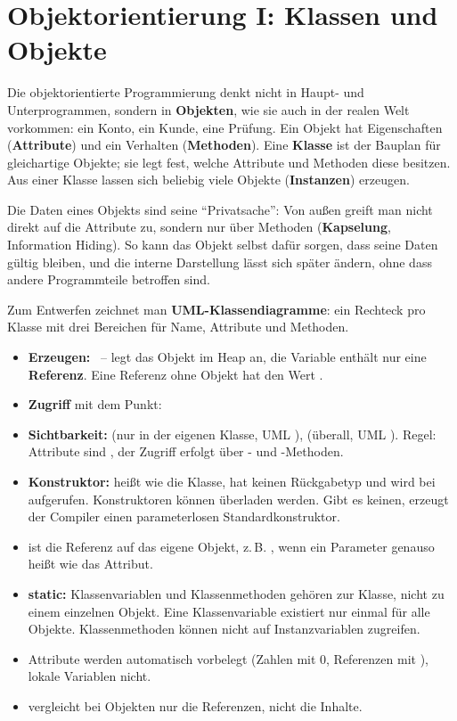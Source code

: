 \section{Objektorientierung I: Klassen und Objekte}
\worum
Die objektorientierte Programmierung denkt nicht in Haupt- und Unterprogrammen, sondern in \textbf{Objekten}, wie sie auch in der realen Welt vorkommen: ein Konto, ein Kunde, eine Prüfung. Ein Objekt hat Eigenschaften (\textbf{Attribute}) und ein Verhalten (\textbf{Methoden}). Eine \textbf{Klasse} ist der Bauplan für gleichartige Objekte; sie legt fest, welche Attribute und Methoden diese besitzen. Aus einer Klasse lassen sich beliebig viele Objekte (\textbf{Instanzen}) erzeugen.

Die Daten eines Objekts sind seine \enquote{Privatsache}: Von außen greift man nicht direkt auf die Attribute zu, sondern nur über Methoden (\textbf{Kapselung}, Information Hiding). So kann das Objekt selbst dafür sorgen, dass seine Daten gültig bleiben, und die interne Darstellung lässt sich später ändern, ohne dass andere Programmteile betroffen sind.

Zum Entwerfen zeichnet man \textbf{UML-Klassendiagramme}: ein Rechteck pro Klasse mit drei Bereichen für Name, Attribute und Methoden.

\begin{merke}
\begin{itemize}[itemsep=0.1em]
\item \textbf{Erzeugen:}  \ --  legt das Objekt im Heap an, die Variable enthält nur eine \textbf{Referenz}. Eine Referenz ohne Objekt hat den Wert .
\item \textbf{Zugriff} mit dem Punkt: 
\item \textbf{Sichtbarkeit:}  (nur in der eigenen Klasse, UML \code{-}),  (überall, UML \code{+}). Regel: Attribute sind , der Zugriff erfolgt über - und -Methoden.
\item \textbf{Konstruktor:} heißt wie die Klasse, hat keinen Rückgabetyp und wird bei  aufgerufen. Konstruktoren können überladen werden. Gibt es keinen, erzeugt der Compiler einen parameterlosen Standardkonstruktor.
\item {} ist die Referenz auf das eigene Objekt, z.\,B. , wenn ein Parameter genauso heißt wie das Attribut.
\item \textbf{static:} Klassenvariablen und Klassenmethoden gehören zur Klasse, nicht zu einem einzelnen Objekt. Eine Klassenvariable existiert nur einmal für alle Objekte. Klassenmethoden können nicht auf Instanzvariablen zugreifen.
\item Attribute werden automatisch vorbelegt (Zahlen mit 0, Referenzen mit ), lokale Variablen nicht.
\item \code{==} vergleicht bei Objekten nur die Referenzen, nicht die Inhalte.
\end{itemize}
\end{merke}

